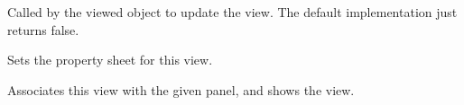 Called by the viewed object to update the view. The default implementation just returns
false.

\label{wxpropertyviewsetpropertysheet}


Sets the property sheet for this view.

\label{wxpropertyviewshowview}


Associates this view with the given panel, and shows the view.

